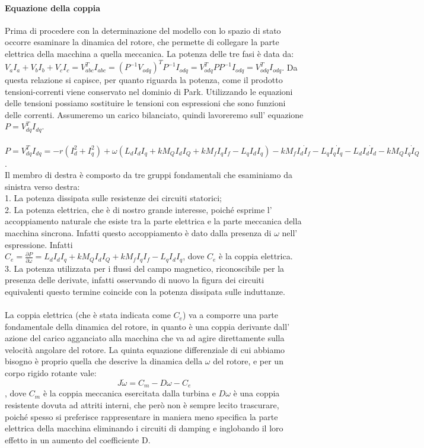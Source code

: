 \documentclass[Lau,noexaminfo]{sapthesis}
\begin{document}
	\paragraph{Equazione della coppia}
	Prima di procedere con la determinazione del modello con lo spazio di stato occorre esaminare la dinamica del rotore, che permette di collegare la parte elettrica della macchina a quella meccanica. La potenza delle tre fasi è data da:\\
	$V_a I_a + V_b I_b + V_c I_c = V^T_{abc} I_{abc}=(P^{-1}V_{odq})^T P^{-1}I_{odq}=V_{odq}^T P P^{-1} I_{odq}=V_{odq}^T I_{odq}$. Da questa relazione si capisce, per quanto riguarda la potenza, come il prodotto tensioni-correnti viene conservato nel dominio di Park. Utilizzando le equazioni delle tensioni possiamo sostituire le tensioni con espressioni che sono funzioni delle correnti. Assumeremo un carico bilanciato, quindi lavoreremo sull' equazione\\
	$P=V_{dq}^T I_{dq}$.\\\\
	$P=V_{dq}^T I_{dq}=-r(I_d^2+I_q^2) + \omega(L_d I_dI_q +kM_QI_dI_Q+kM_f I_qI_f-L_qI_dI_q) -kM_f I_d \dot{I}_f -L_qI_q \dot{I}_q - L_dI_d\dot{I}_d -kM_QI_q\dot{I}_Q$.\\
	Il membro di destra è composto da tre gruppi fondamentali che esaminiamo da sinistra verso destra:\\
	1. La potenza dissipata sulle resistenze dei circuiti statorici;\\
	2. La potenza elettrica, che è di nostro grande interesse, poiché esprime l' accoppiamento naturale che esiste tra la parte elettrica e la parte meccanica della macchina sincrona. Infatti questo accoppiamento è dato dalla presenza di $\omega$ nell' espressione. Infatti\\
	$C_e=\frac{\partial P}{\partial \omega} = L_dI_dI_q+kM_QI_dI_Q+kM_fI_qI_f-L_qI_dI_q $, dove $C_e$ è la coppia elettrica.\\
	3. La potenza utilizzata per i flussi del campo magnetico, riconoscibile per la presenza delle derivate, infatti osservando di nuovo la figura dei circuiti equivalenti questo termine coincide con la potenza dissipata sulle induttanze.\\\\
	La coppia elettrica (che è stata indicata come $C_e$) va a comporre una parte fondamentale della dinamica del rotore, in quanto è una coppia derivante dall' azione del carico agganciato alla macchina che va ad agire direttamente sulla velocità angolare del rotore. La quinta equazione differenziale di cui abbiamo bisogno è proprio quella che descrive la dinamica della $\omega$ del rotore, e per un corpo rigido rotante vale:\\
	\begin{equation}
	J\dot{\omega}=C_m - D\omega - C_e 
	\end{equation}, dove $C_m$ è la coppia meccanica esercitata dalla turbina e $D\omega$ è una coppia resistente dovuta ad attriti interni, che però non è sempre lecito trascurare, poiché spesso si preferisce rappresentare in maniera meno specifica la parte elettrica della macchina eliminando i circuiti di damping e inglobando il loro effetto in un aumento del coefficiente D.
\end{document}
